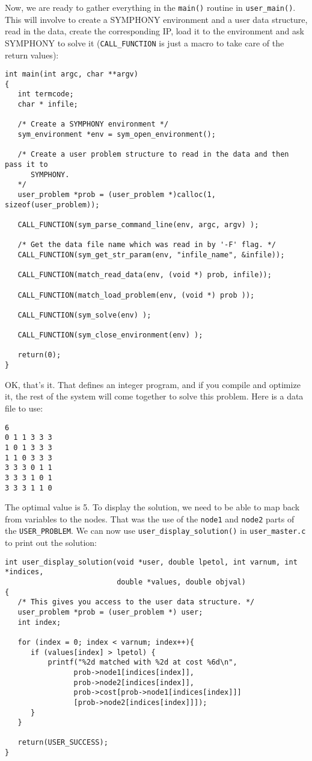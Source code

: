\documentclass[11pt]{article}
\begin{document}
Now, we are ready to gather everything in the \texttt{main()} routine in 
\texttt{user\_main()}. This will involve to create a SYMPHONY environment and 
a user data structure, read in the data, create the corresponding IP, 
load it to the environment and ask SYMPHONY to solve it 
(\texttt{CALL\_FUNCTION} is just a macro to take care of the return values):  

\begin{verbatim}
int main(int argc, char **argv)
{
   int termcode;
   char * infile;

   /* Create a SYMPHONY environment */
   sym_environment *env = sym_open_environment();

   /* Create a user problem structure to read in the data and then pass it to  
      SYMPHONY. 
   */
   user_problem *prob = (user_problem *)calloc(1, sizeof(user_problem));

   CALL_FUNCTION(sym_parse_command_line(env, argc, argv) );

   /* Get the data file name which was read in by '-F' flag. */
   CALL_FUNCTION(sym_get_str_param(env, "infile_name", &infile));

   CALL_FUNCTION(match_read_data(env, (void *) prob, infile));

   CALL_FUNCTION(match_load_problem(env, (void *) prob ));

   CALL_FUNCTION(sym_solve(env) );

   CALL_FUNCTION(sym_close_environment(env) );

   return(0);
}
\end{verbatim}

OK, that's it. That defines an integer program, and if you compile and
optimize it, the rest of the system will come together to solve this problem.
Here is a data file to use:
\begin{verbatim}
6
0 1 1 3 3 3
1 0 1 3 3 3
1 1 0 3 3 3
3 3 3 0 1 1
3 3 3 1 0 1
3 3 3 1 1 0
\end{verbatim}

The optimal value is 5. To display the solution, we need to be able to map
back from variables to the nodes. That was the use of the \texttt{node1} and
\texttt{node2} parts of the \texttt{USER\_PROBLEM}. We can now use
\texttt{user\_display\_solution()} in \texttt{user\_master.c} to print 
out the solution:

\begin{verbatim}
int user_display_solution(void *user, double lpetol, int varnum, int *indices,
                          double *values, double objval)
{
   /* This gives you access to the user data structure. */
   user_problem *prob = (user_problem *) user;
   int index;
 
   for (index = 0; index < varnum; index++){
      if (values[index] > lpetol) {
          printf("%2d matched with %2d at cost %6d\n",
                prob->node1[indices[index]],
                prob->node2[indices[index]],
                prob->cost[prob->node1[indices[index]]]
                [prob->node2[indices[index]]]);
      }	   
   }
   
   return(USER_SUCCESS);
}
\end{verbatim}
\end{document}
